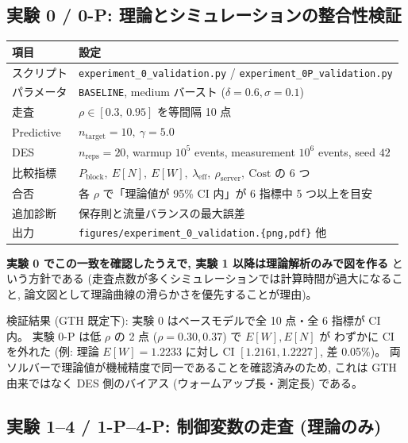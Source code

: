 \documentclass[a4paper,11pt]{article}
\newcommand{\code}[1]{\texttt{#1}}
\newcommand{\eff}{\mathrm{eff}}
\newcommand{\blk}{\mathrm{block}}
\begin{document}
\subsection{実験 0 / 0-P: 理論とシミュレーションの整合性検証}

\begin{center}
\begin{tabular}{ll}
\toprule
項目 & 設定 \\
\midrule
スクリプト & \code{experiment\_0\_validation.py} / \code{experiment\_0P\_validation.py} \\
パラメータ & \code{BASELINE}, medium バースト ($\delta=0.6,\sigma=0.1$) \\
走査 & $\rho\in[0.3,\,0.95]$ を等間隔 10 点 \\
Predictive & $n_{\mathrm{target}}=10,\ \gamma=5.0$ \\
DES & $n_{\mathrm{reps}}=20$, warmup $10^5$ events, measurement $10^6$ events, seed $42$ \\
比較指標 & $P_\blk,\ E[N],\ E[W],\ \lambda_\eff,\ \rho_{\mathrm{server}},\ \mathrm{Cost}$ の 6 つ \\
合否 & 各 $\rho$ で「理論値が 95\% CI 内」が 6 指標中 5 つ以上を目安 \\
追加診断 & 保存則と流量バランスの最大誤差 \\
出力 & \code{figures/experiment\_0\_validation.\{png,pdf\}} 他 \\
\bottomrule
\end{tabular}
\end{center}

\textbf{実験 0 でこの一致を確認したうえで, 実験 1 以降は理論解析のみで図を作る}
という方針である (走査点数が多くシミュレーションでは計算時間が過大になること,
論文図として理論曲線の滑らかさを優先することが理由)。

検証結果 (GTH 既定下): 実験 0 はベースモデルで全 10 点・全 6 指標が CI 内。
実験 0-P は低 $\rho$ の 2 点 ($\rho=0.30,0.37$) で $E[W],E[N]$ が
わずかに CI を外れた (例: 理論 $E[W]=1.2233$ に対し CI $[1.2161,1.2227]$, 差 0.05\%)。
両ソルバーで理論値が機械精度で同一であることを確認済みのため,
これは GTH 由来ではなく DES 側のバイアス (ウォームアップ長・測定長) である。

\subsection{実験 1--4 / 1-P--4-P: 制御変数の走査 (理論のみ)}
\end{document}
